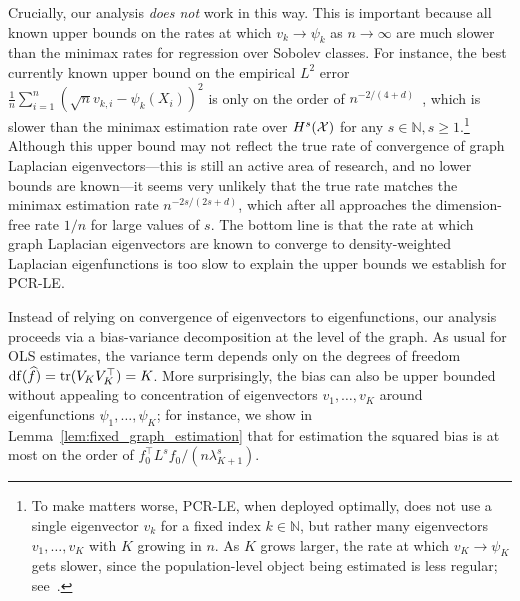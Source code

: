 Crucially, our analysis \emph{does not} work in this way. This is important because all known upper bounds on the rates at which $v_k \to \psi_k$ as $n \to \infty$ are much slower than the minimax rates for regression over Sobolev classes. For instance, the best currently known upper bound on the empirical $L^2$ error $\frac{1}{n}\sum_{i = 1}^{n}(\sqrt{n} v_{k,i} - \psi_k(X_i))^2$ is only on the order of $n^{-2/(4 + d)}$~\citep{cheng2021}, which is slower than the minimax estimation rate over $H^s(\mathcal{X})$ for any $s \in \mathbb{N}, s \geq 1$.\footnote{To make matters worse, PCR-LE, when deployed optimally, does not use a single eigenvector $v_k$ for a fixed index $k \in \mathbb{N}$, but rather many eigenvectors $v_1,\ldots,v_K$ with $K$ growing in $n$. As $K$ grows larger, the rate at which $v_K \to \psi_K$ gets slower, since the population-level object being estimated is less regular; see~\citep{burago2014,trillos2019}.} Although this upper bound may not reflect the true rate of convergence of graph Laplacian eigenvectors---this is still an active area of research, and no lower bounds are known---it seems very unlikely that the true rate matches the minimax estimation rate $n^{-2s/(2s + d)}$, which after all approaches the dimension-free rate $1/n$ for large values of $s$. The bottom line is that the rate at which graph Laplacian eigenvectors are known to converge to density-weighted Laplacian eigenfunctions is too slow to explain the upper bounds we establish for PCR-LE.

Instead of relying on convergence of eigenvectors to eigenfunctions, our analysis proceeds via a bias-variance decomposition at the level of the graph. As usual for OLS estimates, the variance term depends only on the degrees of freedom $\mathrm{df}(\widehat{f}) = \mathrm{tr}(V_KV_K^{\top}) = K$. More surprisingly, the bias can also be upper bounded without appealing to concentration of eigenvectors $v_1,\ldots,v_K$ around eigenfunctions $\psi_1,\ldots,\psi_K$; for instance, we show in Lemma~\ref{lem:fixed_graph_estimation} that for estimation the squared bias is at most on the order of $f_0^{\top} L^s f_0/(n\lambda_{K + 1}^s)$. 

